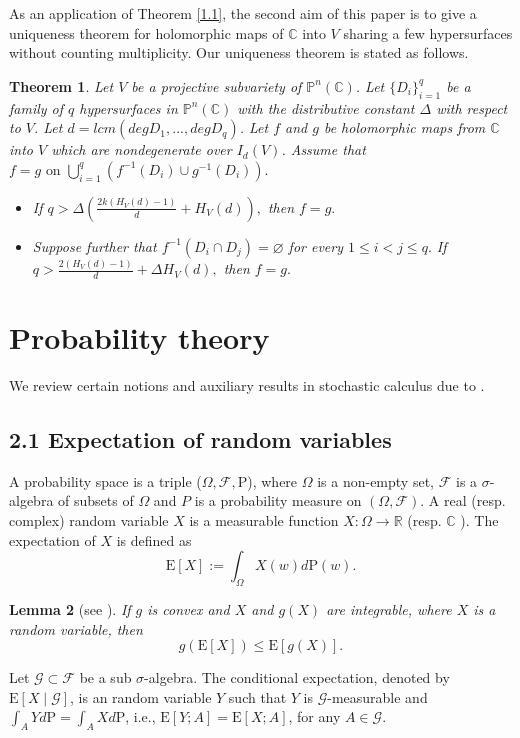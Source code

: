 \documentclass[12pt]{amsart}
\newtheorem{theorem}{Theorem}[section]
\newtheorem{lemma}[theorem]{Lemma}
\newcommand{\C}{{\mathbb{C}}}
\begin{document}
As an application of Theorem \ref{1.1},  the second aim of this paper is to give a uniqueness theorem for holomorphic maps of $\C$ into $V$ sharing a few hypersurfaces without counting multiplicity. Our uniqueness theorem is stated as follows.

\begin{theorem}\label{1.2}
Let $V$ be a projective subvariety of $\mathbb P^n(\mathbb C)$.  Let $\{D_i\}_{i=1}^q$ be a family of $q$ hypersurfaces in $\mathbb P^n(\mathbb C)$ with the distributive constant $\Delta$ with respect to $V$. Let $d=lcm (deg D_1,...,deg D_q)$. Let $f$ and $g$ be holomorphic maps from $\C$ into $V$ which are nondegenerate over $I_d(V)$.  Assume that $f=g \text{ on }\bigcup_{i=1}^q(f^{-1}(D_i)\cup g^{-1}(D_i)).$
\begin{itemize}
    \item[(a)] If $q>\Delta\left(\frac{2k(H_V(d)-1)}{d}+ H_V(d)\right),$ then $f=g.$
    \item[(b)] Suppose further that $f^{-1}(D_i\cap D_j)=\varnothing$ for every $1\le i< j\le q.$ If $q>\frac{2(H_V(d)-1)}{d}+\Delta H_V(d),$ then $f=g.$
\end{itemize}
\end{theorem}

\section{Probability theory}
We review certain notions and auxiliary results in stochastic calculus due to \cite{RCD}.
\subsection*{2.1 Expectation of random variables}
A probability space is a triple ($\Omega, \mathcal{F}, \mathrm{P}$), where $\Omega$ is a non-empty set, $\mathcal{F}$ is a $\sigma$-algebra of subsets of $\Omega$ and $P$ is a probability measure on $(\Omega, \mathcal{F})$. A real (resp. complex) random variable $X$ is a measurable function $X: \Omega \rightarrow \mathbb{R}$ (resp. $\mathbb{C}$ ). The expectation of $X$ is defined as
$$\mathrm{E}[X]:=\int_{\Omega} X(w) d \mathrm{P}(w).$$
\begin{lemma}[{see \cite[Proposition 1.3]{B}}]\label{2.1}
If $g$ is convex and $X$ and $g(X)$ are integrable, where $X$ is a random variable, then
$$g(\mathrm{E}[X]) \le \mathrm{E}[g(X)].$$
\end{lemma}

Let $\mathcal{G} \subset \mathcal{F}$ be a sub $\sigma$-algebra. The conditional expectation, denoted by $\mathrm{E}[X \mid \mathcal{G}]$, is an random variable $Y$ such that $Y$ is $\mathcal{G}$-measurable and $\int_{A} Y d \mathrm{P}=\int_{A} X d \mathrm{P}$, i.e., $\mathrm{E}[Y ; A]=\mathrm{E}[X ; A]$, for any $A \in \mathcal{G}$.
\end{document}
